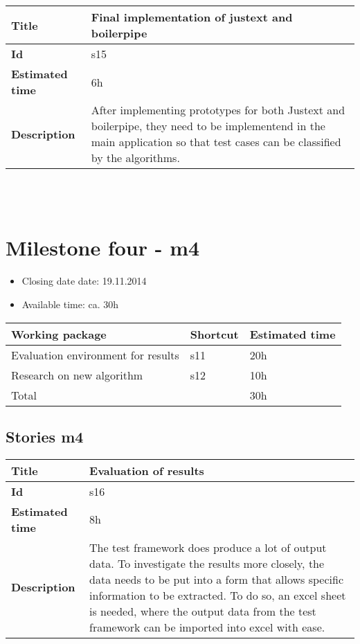     \begin{tabular}{ | p{4cm} | p{10cm} |}
    \hline
    \textbf{Title} & Final implementation of justext and boilerpipe\\ \hline
    \textbf{Id} & s15\\ \hline
    \textbf{Estimated time} & 6h \\ \hline
    \textbf{Description} &  After implementing prototypes for both Justext and boilerpipe, they need to be implementend in the main application so that test cases can be classified by the algorithms.\\ 
    \hline
    \end{tabular} \\\\





\section{Milestone four - m4}

\begin{itemize}
\item Closing date date: 19.11.2014
\item Available time: ca. 30h
\end{itemize}

    \begin{tabular}{ | p{10cm} | p{2cm} | p{2cm} |}
    \hline
    \textbf{Working package} & \textbf{Shortcut}& \textbf{Estimated time} \\ \hline
    Evaluation environment for results & s11 &20h \\
    Research on new algorithm & s12 &10h \\ \hline
    Total &  & 30h\\

    \hline
    \end{tabular}

\subsection {Stories m4}

    \begin{tabular}{ | p{4cm} | p{10cm} |}
    \hline
    \textbf{Title} & Evaluation of results\\ \hline
    \textbf{Id} & s16\\ \hline
    \textbf{Estimated time} & 8h \\ \hline
    \textbf{Description} &  The test framework does produce a lot of output data. To investigate the results more closely, the data needs to be put into a form that allows specific information to be extracted. To do so, an excel sheet is needed, where the output data from the test framework can be imported into excel with ease.\\ 
    \hline
    \end{tabular} \\\\


